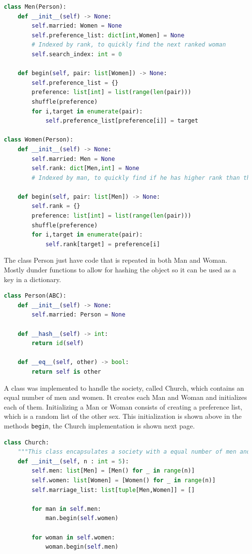 \documentclass[a4paper,12pt,twocolumn]{article}
\begin{document}
\begin{lstlisting}[float=htbp,language=Python]
class Men(Person):
	def __init__(self) -> None:
		self.married: Women = None
		self.preference_list: dict[int,Women] = None 
		# Indexed by rank, to quickly find the next ranked woman
		self.search_index: int = 0

	def begin(self, pair: list[Women]) -> None:
		self.preference_list = {}
		preference: list[int] = list(range(len(pair)))
		shuffle(preference)
		for i,target in enumerate(pair):
			self.preference_list[preference[i]] = target
			
class Women(Person):
	def __init__(self) -> None:
		self.married: Men = None
		self.rank: dict[Men,int] = None	
		# Indexed by man, to quickly find if he has higher rank than the currently married

	def begin(self, pair: list[Men]) -> None:
		self.rank = {}
		preference: list[int] = list(range(len(pair)))
		shuffle(preference)
		for i,target in enumerate(pair):
			self.rank[target] = preference[i]
\end{lstlisting}

The class Person just have code that is repeated in both Man and Woman.
Mostly dunder functions to allow for hashing the object so it can be used as a key in a dictionary.

\begin{lstlisting}[float=htbp,language=Python]
class Person(ABC): 
	def __init__(self) -> None:
		self.married: Person = None

	def __hash__(self) -> int:
		return id(self)

	def __eq__(self, other) -> bool:
		return self is other
\end{lstlisting}

A class was implemented to handle the society, called Church, which contains an equal number of men and women.
It creates each Man and Woman and initializes each of them.
Initializing a Man or Woman consists of creating a preference list, which is a random list of the other sex.
This initialization is shown above in the methods \verb|begin|, the Church implementation is shown next page.

\begin{lstlisting}[float=htbp,language=Python]
class Church:
	"""This class encapsulates a society with a equal number of men and women"""
	def __init__(self, n : int = 5):
		self.men: list[Men] = [Men() for _ in range(n)]
		self.women: list[Women] = [Women() for _ in range(n)]
		self.marriage_list: list[tuple[Men,Women]] = []

		for man in self.men:
			man.begin(self.women)

		for woman in self.women:
			woman.begin(self.men)
\end{lstlisting}
\end{document}
